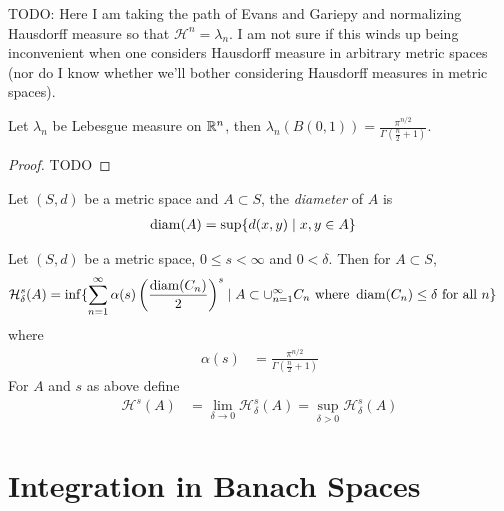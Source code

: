 TODO:  Here I am taking the path of Evans and Gariepy and normalizing
Hausdorff measure so that $\mathcal{H}^n = \lambda_n$.  I am not sure
if this winds up being inconvenient when one considers Hausdorff
measure in arbitrary metric spaces (nor do I know whether we'll bother
considering Hausdorff measures in metric spaces).

\begin{lem}Let $\lambda_n$ be Lebesgue measure on $\mathbb{R}^n$, then
  $\lambda_n(B(0, 1)) = \frac{\pi^{n/2}}{\Gamma(\frac{n}{2} + 1)}$.
\end{lem}
\begin{proof}
TODO
\end{proof}

\begin{defn}Let $(S,d)$ be a metric space and $A \subset S$, the
  \emph{diameter} of $A$ is 
\begin{align*}
\operatorname*{diam}(A) &= \sup \lbrace d(x,y) \mid x,y \in A \rbrace
\end{align*}
\end{defn}

\begin{defn}Let $(S,d)$ be a metric space, $0 \leq s < \infty$ and $0
  < \delta$.  Then for $A \subset S$,
\begin{align*}
\mathcal{H}^s_\delta(A) &= \inf \lbrace \sum_{n=1}^\infty \alpha(s)
\left ( \frac{\operatorname*{diam}(C_n)}{2}\right )^s \mid A \subset
\cup_{n=1}^\infty C_n \text{ where } \operatorname*{diam}(C_n) \leq \delta \text{ for
  all } n\rbrace
\end{align*}
where 
\begin{align*}
\alpha(s) &= \frac{\pi^{n/2}}{\Gamma(\frac{n}{2} + 1)}
\end{align*}
For $A$ and $s$ as above define
\begin{align*}
\mathcal{H}^s(A) &= \lim_{\delta \to 0} \mathcal{H}_\delta^s(A) = \sup_{\delta>0} \mathcal{H}_\delta^s(A)
\end{align*}
\end{defn}

\section{Integration in Banach Spaces}

